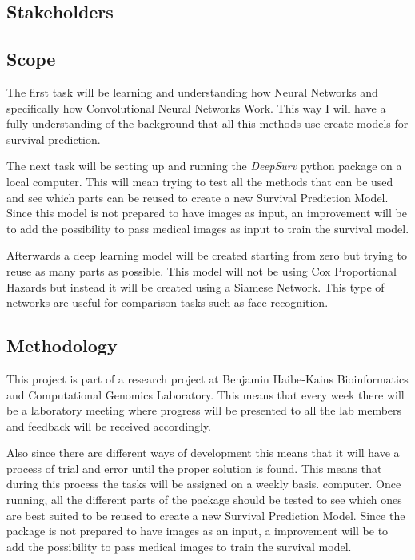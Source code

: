 \subsection{Stakeholders}



\subsection{Scope}

The first task will be learning and understanding how Neural Networks and specifically how 
Convolutional Neural Networks Work. This way I will have a fully understanding of the background
that all this methods use create models for survival prediction.

The next task will be setting up and running the \emph{DeepSurv} python package on a local 
computer. This will mean trying to test all the methods that can be used and see which parts 
can be reused to create a new Survival Prediction Model. Since this model is not prepared
to have images as input, an improvement will be to add the possibility to pass medical 
images as input to train the survival model. 

Afterwards a deep learning model will be created starting from zero but trying to reuse
as many parts as possible. This model will not be using Cox Proportional Hazards but instead
it will be created using a Siamese Network. This type of networks are useful for comparison
tasks such as face recognition. 

\subsection{Methodology}

This project is part of a research project at Benjamin Haibe-Kains Bioinformatics and 
Computational Genomics Laboratory. This means that every week there will be a laboratory meeting
where progress will be presented to all the lab members and feedback will be received accordingly. 

Also since there are different ways of development this means that it will have a process of trial
and error until the proper solution is found. This means that during this process the
tasks will be assigned on a weekly basis.
computer. Once running, all the different parts of the package should be tested to see which
ones are best suited to be reused to create a new Survival Prediction Model. Since the package
is not prepared to have images as an input, a improvement will be to add the possibility to 
pass medical images to train the survival model.

